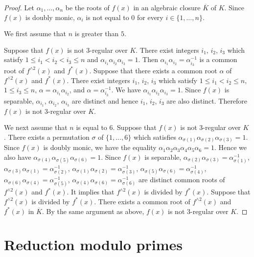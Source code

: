 \documentclass{amsart}
\theoremstyle{plain}
\theoremstyle{definition}
\theoremstyle{remark}
\begin{document}
\begin{proof}
Let $\alpha_1,\ldots,\alpha_n$ be the roots of $f(x)$ in an algebraic closure $\overline{K}$ of $K$. 
Since $f(x)$ is doubly monic, $\alpha_i$ is not equal to $0$ for every $i\in\{1,\ldots ,n\}$. 

We first assume that $n$ is greater than $5$. 

Suppose that $f(x)$ is not $3$-regular over $K$. 
There exist integers $i_1$, $i_2$, $i_3$ which satisfy $1\leq i_1<i_2<i_3\leq n$ 
and $\alpha_{i_1}\alpha_{i_2}\alpha_{i_3}=1$. 
Then $\alpha_{i_1}\alpha_{i_2}=\alpha_{i_3}^{-1}$ is a common root of $f^{\wedge 2}(x)$ and $f^*(x)$. 
Suppose that there exists a common root $\alpha$ of $f^{\wedge 2}(x)$ and $f^*(x)$. 
There exist integers $i_1$, $i_2$, $i_3$ which satisfy $1\leq i_1<i_2\leq n$, $1\leq i_3\leq n$, 
$\alpha=\alpha_{i_1}\alpha_{i_2}$, and $\alpha=\alpha_{i_3}^{-1}$. 
We have $\alpha_{i_1}\alpha_{i_2}\alpha_{i_3}=1$. 
Since $f(x)$ is separable, $\alpha_{i_1}$, $\alpha_{i_2}$, $\alpha_{i_3}$ are distinct and hence 
$i_1$, $i_2$, $i_3$ are also distinct. Therefore $f(x)$ is not $3$-regular over $K$. 

We next assume that $n$ is equal to $6$. 
Suppose that $f(x)$ is not $3$-regular over $K$. 
There exists a permutation $\sigma$ of $\{1,\ldots ,6\}$ which satisfies 
$\alpha_{\sigma(1)}\alpha_{\sigma(2)}\alpha_{\sigma(3)}=1$. 
Since $f(x)$ is doubly monic, we have the equality 
$\alpha_1\alpha_2\alpha_3\alpha_4\alpha_5\alpha_6=1$. 
Hence we also have $\alpha_{\sigma(4)}\alpha_{\sigma(5)}\alpha_{\sigma(6)}=1$. 
Since $f(x)$ is separable, $\alpha_{\sigma(2)}\alpha_{\sigma(3)}=\alpha_{\sigma(1)}^{-1}$, 
$\alpha_{\sigma(3)}\alpha_{\sigma(1)}=\alpha_{\sigma(2)}^{-1}$, 
$\alpha_{\sigma(1)}\alpha_{\sigma(2)}=\alpha_{\sigma(3)}^{-1}$, 
$\alpha_{\sigma(5)}\alpha_{\sigma(6)}=\alpha_{\sigma(4)}^{-1}$, 
$\alpha_{\sigma(6)}\alpha_{\sigma(4)}=\alpha_{\sigma(5)}^{-1}$, 
$\alpha_{\sigma(4)}\alpha_{\sigma(6)}=\alpha_{\sigma(6)}^{-1}$ are distinct common roots of 
$f^{\wedge 2}(x)$ and $f^*(x)$. It implies that $f^{\wedge 2}(x)$ is divided by $f^*(x)$. 
Suppose that $f^{\wedge 2}(x)$ is divided by $f^*(x)$. 
There exists a common root of $f^{\wedge 2}(x)$ and $f^*(x)$ in $\overline{K}$. 
By the same argument as above, $f(x)$ is not $3$-regular over $K$. 
\end{proof}


\section{Reduction modulo primes}
\end{document}
